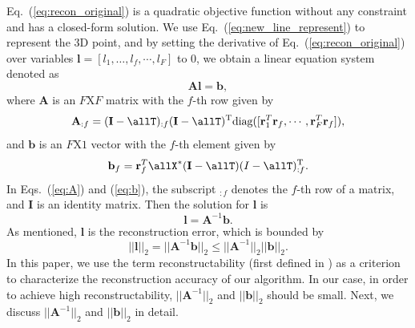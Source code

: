 Eq.~(\ref{eq:recon_original}) is a quadratic objective function without any constraint and has a closed-form solution. We use Eq.~(\ref{eq:new_line_represent}) to represent the 3D point, and by setting the derivative of Eq.~(\ref{eq:recon_original}) over variables $\mathbf{l} = [l_1,\dots,l_f,\cdots,l_F ]$ to 0, we obtain a linear equation system denoted as
\begin{equation}
\mathbf{A}\mathbf{l} = \mathbf{b},	\label{eq:alb}
\end{equation}
where $\mathbf{A}$ is an $F \text{X} F$ matrix with the $f$-th row given by
\begin{equation}
\mathbf{A}_{:f} = (\mathbf{I}-\allT)_{:f}(\mathbf{I}-\allT)^\text{T} \text{diag}([\mathbf{r}^T_1 \mathbf{r}_f, \cdots, \mathbf{r}_F^T \mathbf{r}_f] ),
\label{eq:A}
\end{equation}
and $\mathbf{b}$ is an $F \text{X} 1$ vector with the $f$-th element given by
\begin{equation}
\mathbf{b}_{f} = \mathbf{r}_f^T \allX^* (\mathbf{I}-\allT) (I-\allT)_{:f}^{\text{T}}.
\label{eq:b}
\end{equation}
In Eqs.~(\ref{eq:A}) and (\ref{eq:b}), the subscript $_{:f}$ denotes the $f$-th row of a matrix, and $\mathbf{I}$ is an identity matrix. Then the solution for $\mathbf{l}$ is
\begin{equation}
\mathbf{l} = \mathbf{A}^{-1}\mathbf{b}. 
\label{eq:a_minus_1_b}
\end{equation}
As mentioned, $\mathbf{l}$ is the reconstruction error, 
which is bounded by 
\begin{equation}
||\mathbf{l}||_2= ||\mathbf{A}^{-1} \mathbf{b}||_2 \leq ||\mathbf{A}^{-1}||_2 ||\mathbf{b}||_2.
\end{equation}
In this paper, we use the term reconstructability (first defined in \cite{Park_ECCV2010}) as a criterion to characterize the reconstruction accuracy of our algorithm. 
In our case, in order to achieve high reconstructability, $||\mathbf{A}^{-1}||_2$ and $||\mathbf{b}||_2$ should be small. Next, we discuss $||\mathbf{A}^{-1}||_2$ and $||\mathbf{b}||_2$ in detail.



